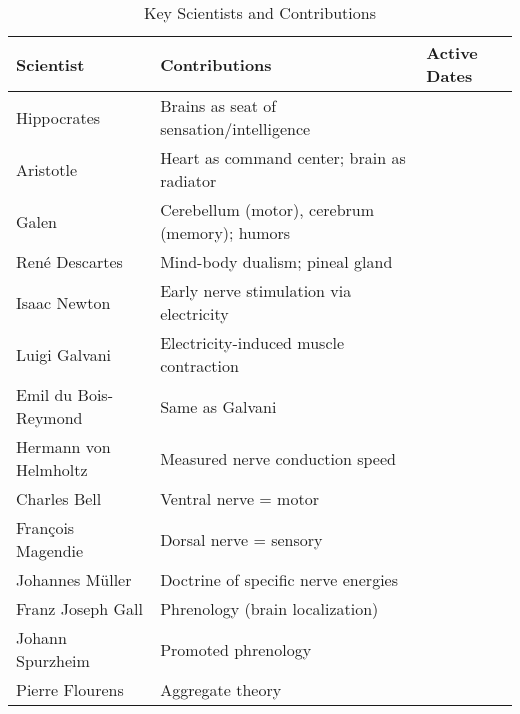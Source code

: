 \begin{landscape}
    \pagestyle{plain}
    \vfill
    \begin{table}[h]
        \centering
        \caption{Key Scientists and Contributions}
        \label{tab:neuroscientists}
        \begin{tabular}{p{5.2cm}p{9.5cm}p{3cm}}
            \toprule
            \textbf{Scientist}    & \textbf{Contributions}                             & \textbf{Active Dates} \\
            \midrule
            Hippocrates           & Brains as seat of sensation/intelligence                                   \\
            Aristotle             & Heart as command center; brain as radiator                                 \\
            Galen                 & Cerebellum (motor), cerebrum (memory); humors                              \\
            René Descartes        & Mind-body dualism; pineal gland                                            \\
            Isaac Newton          & Early nerve stimulation via electricity                                    \\
            Luigi Galvani         & Electricity-induced muscle contraction                                     \\
            Emil du Bois-Reymond  & Same as Galvani                                                            \\
            Hermann von Helmholtz & Measured nerve conduction speed                                            \\
            Charles Bell          & Ventral nerve = motor                                                      \\
            François Magendie     & Dorsal nerve = sensory                                                     \\
            Johannes Müller       & Doctrine of specific nerve energies                                        \\
            Franz Joseph Gall     & Phrenology (brain localization)                                            \\
            Johann Spurzheim      & Promoted phrenology                                                        \\
            Pierre Flourens       & Aggregate theory                                                           \\

\end{tabular}
\end{table}
\end{landscape}
